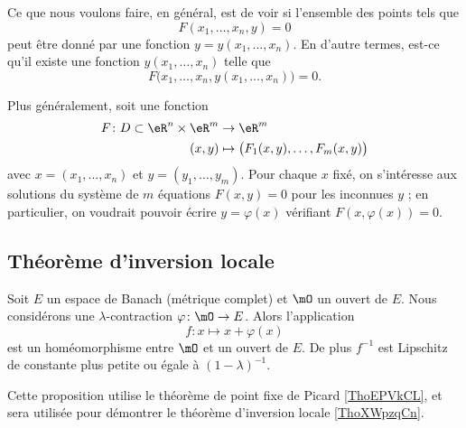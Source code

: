 Ce que nous voulons faire, en général, est de voir si l'ensemble des points tels que
\begin{equation}
	F(x_1,\ldots,x_n,y)=0
\end{equation}
peut être donné par une fonction $y=y(x_1,\ldots,x_n)$. En d'autre termes, est-ce qu'il existe une fonction $y(x_1,\ldots,x_n)$ telle que
\begin{equation}
	F\big( x_1,\ldots,x_n,y(x_1,\ldots,x_n)\big)=0.
\end{equation}

Plus généralement, soit une fonction
\begin{equation}
    \begin{aligned}
        F\colon D\subset \eR^n\times \eR^m&\to \eR^m \\
        (x,y)&\mapsto \big( F_1(x,y),\ldots, F_m(x,y) \big) 
    \end{aligned}
\end{equation}
avec $x = (x_1,\ldots, x_n)$ et $y = (y_1,\ldots,y_m)$. Pour chaque $x$ fixé, on s'intéresse aux solutions du système de $m$ équations $F(x,y) = 0$ pour les inconnues $y$ ; en particulier, on voudrait pouvoir écrire $y = \varphi(x)$ vérifiant $F(x,\varphi(x)) = 0$.

\subsection{Théorème d'inversion locale}

\begin{lemma} \label{LemGZoqknC}
    Soit \( E\) un espace de Banach (métrique complet) et \( \mO\) un ouvert de \( E\). Nous considérons une \( \lambda\)-contraction \( \varphi\colon \mO\to E\). Alors l'application
    \begin{equation}
    f\colon x\mapsto x+\varphi(x)
    \end{equation}
    est un homéomorphisme entre \( \mO\) et un ouvert de \( E\). De plus \( f^{-1}\) est Lipschitz de constante plus petite ou égale à \( (1-\lambda)^{-1}\).
\end{lemma}
Cette proposition utilise le théorème de point fixe de Picard \ref{ThoEPVkCL},
et sera utilisée pour démontrer le théorème d'inversion locale \ref{ThoXWpzqCn}.


